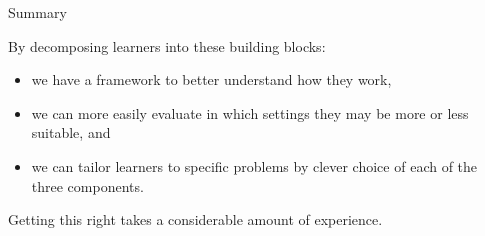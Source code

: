\documentclass[11pt,compress,t,notes=noshow, xcolor=table]{beamer}
\begin{document}

\begin{vbframe}{Summary}


  By decomposing learners into these building blocks:

  \lz
  
  \begin{itemize}

    \item we have a framework to better understand how they work,
    
    \item we can more easily evaluate in which settings they may be more or less 
    suitable, and
    
    \item we can tailor learners to specific problems by clever choice of each 
    of the three components.
    
  \end{itemize}
  
  


\lz

Getting this right takes a considerable amount of experience.

\end{vbframe}



\endlecture
\end{document}
